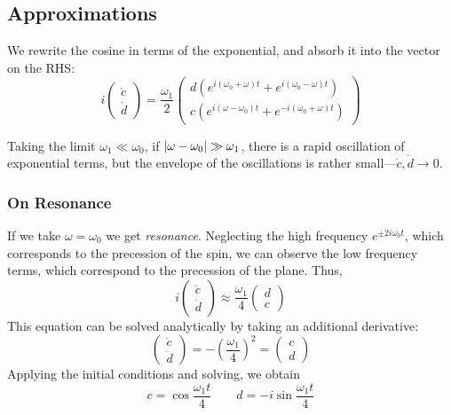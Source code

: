 \subsection{Approximations}
We rewrite the cosine in terms of the exponential, and absorb it into the vector on the RHS\@:
\[i \begin{pmatrix}
	\dot c\\\dot d
\end{pmatrix} = \frac{\omega_1}{2} \begin{pmatrix}
d\left(e^{i(\omega_0+\omega)t}+e^{i(\omega_0-\omega)t}\right)\\
c\left(e^{i(\omega-\omega_0)t}+e^{-i(\omega_0+\omega)t}\right)
\end{pmatrix}\]

Taking the limit \(\omega_1\ll\omega_0\), if \(\left|\omega-\omega_0\right|\gg\omega_1\), there is a rapid oscillation of exponential terms, but the envelope of the oscillations is rather small---\(\dot c, \dot d\to0\).

\subsubsection{On Resonance}
If we take \(\omega=\omega_0\) we get \emph{resonance}. Neglecting the high frequency \(e^{\pm2i\omega_0t}\), which corresponds to the precession of the spin, we can observe the low frequency terms, which correspond to the precession of the plane. Thus,
\begin{equation}
	i \begin{pmatrix}
		\dot c \\ \dot d 
	\end{pmatrix}\approx\frac{\omega_1}{4} \begin{pmatrix}
		d\\c
	\end{pmatrix}
\end{equation}
This equation can be solved analytically by taking an additional derivative:
\[ \begin{pmatrix}
	\ddot c\\\ddot d
	\end{pmatrix} = -\left(\frac{\omega_1}{4}\right)^2= \begin{pmatrix}
	c\\d
\end{pmatrix}\]
Applying the initial conditions and solving, we obtain
\begin{equation}
	c=\cos\frac{\omega_1t}{4} \qquad d = -i\sin\frac{\omega_1 t}{4}
\end{equation}

